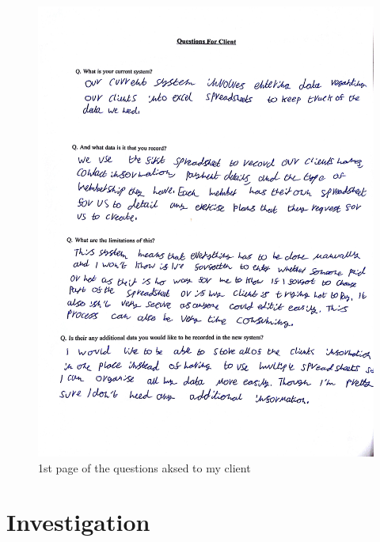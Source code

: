 \begin{figure}[H]
    \includegraphics[width=\textwidth]{questionaire 1.jpg}
    \caption{1st page of the questions aksed to my client} \label{fig:1st page of the questions aksed to my client}
\end{figure}
\section{Investigation}

